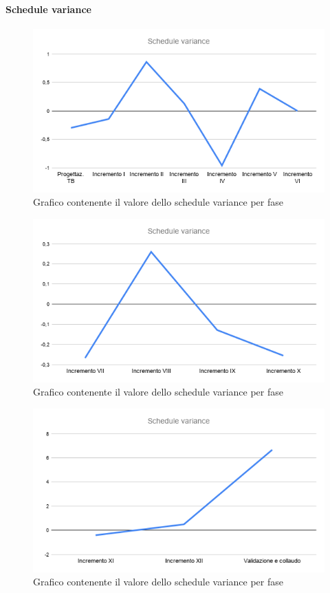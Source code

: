 	\paragraph{Schedule variance}
		\begin{figure}[H]
			\centering
			\includegraphics[width=0.8\linewidth]{./res/images/SV_1.png}
			\caption{Grafico contenente il valore dello schedule variance per fase}
			\label{fig:Grafico contenente il valore dello schedule variance per fase}
		\end{figure}
		\begin{figure}[H]
			\centering
			\includegraphics[width=0.8\linewidth]{./res/images/SV_2.png}
			\caption{Grafico contenente il valore dello schedule variance per fase}
			\label{fig:Grafico contenente il valore dello schedule variance per fase}
		\end{figure}
		\begin{figure}[H]
			\centering
			\includegraphics[width=0.8\linewidth]{./res/images/SV_3.png}
			\caption{Grafico contenente il valore dello schedule variance per fase}
			\label{fig:Grafico contenente il valore dello schedule variance per fase}
		\end{figure}


